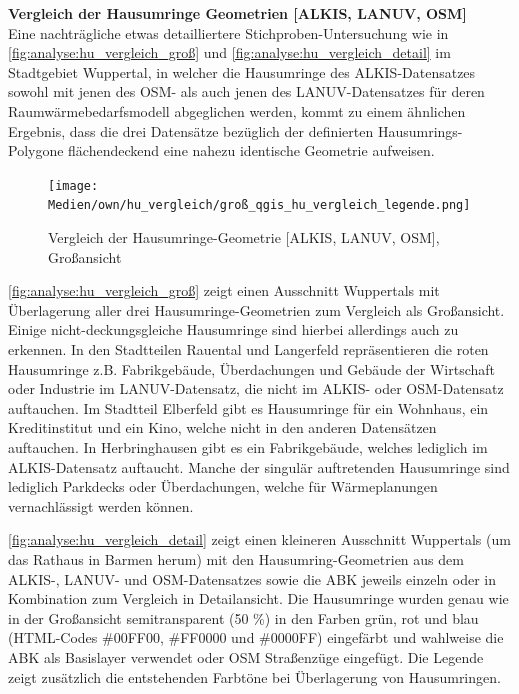 		\textbf{Vergleich der Hausumringe Geometrien [ALKIS, LANUV, OSM]}\\
		Eine nachträgliche etwas detailliertere Stichproben-Untersuchung wie in \autoref{fig:analyse:hu_vergleich_groß} und \autoref{fig:analyse:hu_vergleich_detail} im Stadtgebiet Wuppertal, in welcher die Hausumringe des ALKIS-Datensatzes sowohl mit jenen des OSM- als auch jenen des LANUV-Datensatzes für deren Raumwärmebedarfsmodell abgeglichen werden, kommt zu einem ähnlichen Ergebnis, dass die drei Datensätze bezüglich der definierten Hausumrings-Polygone flächendeckend eine nahezu identische Geometrie aufweisen.
		
		\begin{figure}[H]
			\texttt{[image: Medien/own/hu\_vergleich/groß\_qgis\_hu\_vergleich\_legende.png]}
			\caption{Vergleich der Hausumringe-Geometrie [ALKIS, LANUV, OSM], Großansicht}
			\label{fig:analyse:hu_vergleich_groß}
		\end{figure}
		
		\autoref{fig:analyse:hu_vergleich_groß} zeigt einen Ausschnitt Wuppertals mit Überlagerung aller drei Hausumringe-Geometrien zum Vergleich als Großansicht. Einige nicht-deckungsgleiche Hausumringe sind hierbei allerdings auch zu erkennen. In den Stadtteilen Rauental und Langerfeld repräsentieren die roten Hausumringe z.B. Fabrikgebäude, Überdachungen und Gebäude der Wirtschaft oder Industrie im LANUV-Datensatz, die nicht im ALKIS- oder OSM-Datensatz auftauchen. Im Stadtteil Elberfeld gibt es Hausumringe für ein Wohnhaus, ein Kreditinstitut und ein Kino, welche nicht in den anderen Datensätzen auftauchen. In Herbringhausen gibt es ein Fabrikgebäude, welches lediglich im ALKIS-Datensatz auftaucht. Manche der singulär auftretenden Hausumringe sind lediglich Parkdecks oder Überdachungen, welche für Wärmeplanungen vernachlässigt werden können. 
		
		\autoref{fig:analyse:hu_vergleich_detail} zeigt einen kleineren Ausschnitt Wuppertals (um das Rathaus in Barmen herum) mit den Hausumring-Geometrien aus dem ALKIS-, LANUV- und OSM-Datensatzes sowie die ABK jeweils einzeln oder in Kombination zum Vergleich in Detailansicht. Die Hausumringe wurden genau wie in der Großansicht semitransparent (50 \%) in den Farben grün, rot und blau (HTML-Codes \#00FF00, \#FF0000 und \#0000FF) eingefärbt und wahlweise die ABK als Basislayer verwendet oder OSM Straßenzüge eingefügt. Die Legende zeigt zusätzlich die entstehenden Farbtöne bei Überlagerung von Hausumringen.\\

